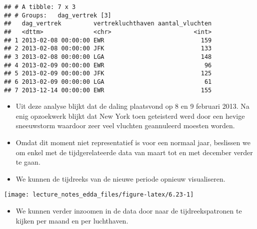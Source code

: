 \documentclass[]{memoir}
\newenvironment{Shaded}{\begin{snugshade}}{\end{snugshade}}
\newcommand{\DataTypeTok}[1]{\textcolor[rgb]{0.13,0.29,0.53}{#1}}
\newcommand{\KeywordTok}[1]{\textcolor[rgb]{0.13,0.29,0.53}{\textbf{#1}}}
\newcommand{\NormalTok}[1]{#1}
\newcommand{\OperatorTok}[1]{\textcolor[rgb]{0.81,0.36,0.00}{\textbf{#1}}}
\newcommand{\StringTok}[1]{\textcolor[rgb]{0.31,0.60,0.02}{#1}}
\providecommand{\tightlist}{%
  \setlength{\itemsep}{0pt}\setlength{\parskip}{0pt}}
\begin{document}
\begin{verbatim}
## # A tibble: 7 x 3
## # Groups:   dag_vertrek [3]
##   dag_vertrek         vertrekluchthaven aantal_vluchten
##   <dttm>              <chr>                       <int>
## 1 2013-02-08 00:00:00 EWR                           159
## 2 2013-02-08 00:00:00 JFK                           133
## 3 2013-02-08 00:00:00 LGA                           148
## 4 2013-02-09 00:00:00 EWR                            96
## 5 2013-02-09 00:00:00 JFK                           125
## 6 2013-02-09 00:00:00 LGA                            61
## 7 2013-12-14 00:00:00 EWR                           155
\end{verbatim}

\begin{itemize}
\item
  Uit deze analyse blijkt dat de daling plaatsvond op 8 en 9 februari 2013. Na enig opzoekwerk blijkt dat New York toen geteisterd werd door een hevige sneeuwstorm waardoor zeer veel vluchten geannuleerd moesten worden.
\item
  Omdat dit moment niet representatief is voor een normaal jaar, beslissen we om enkel met de tijdgerelateerde data van maart tot en met december verder te gaan.
\item
  We kunnen de tijdreeks van de nieuwe periode opnieuw visualiseren.
\end{itemize}

\texttt{[image: lecture\_notes\_edda\_files/figure-latex/6.23-1]}

\begin{itemize}
\tightlist
\item
  We kunnen verder inzoomen in de data door naar de tijdreekspatronen te kijken per maand en per luchthaven.
\end{itemize}

\begin{Shaded}
\end{Shaded}
\end{document}
